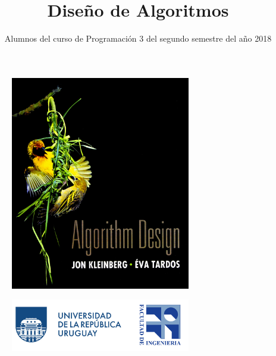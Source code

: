 \documentclass[a4paper]{article}
\title{Diseño de Algoritmos}
\author{Alumnos del curso de Programación 3 del segundo semestre del año 2018}
\begin{document}
\maketitle	









\begin{figure}[h] 
	\centering
	\includegraphics[width=0.7\textwidth]{Tapa-libro.png}
\end{figure}

\begin{figure}[b] 
	\centering
	\includegraphics[width=0.7\textwidth]{logo-fing.png}
\end{figure}
\end{document}
